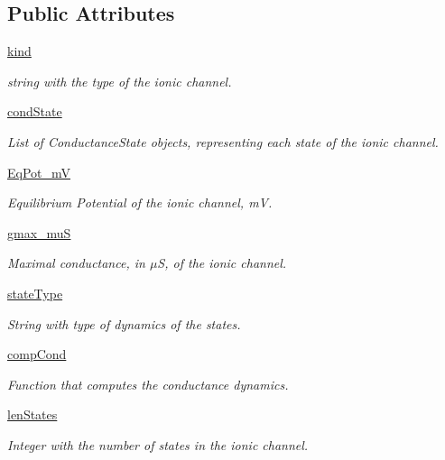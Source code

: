 \subsection*{Public Attributes}
\begin{DoxyCompactItemize}
\item 
\hyperlink{class_channel_conductance_1_1_channel_conductance_a7bf3e28aab2160014358cde589f2ec39}{kind}
\begin{DoxyCompactList}\small\item\em string with the type of the ionic channel. \end{DoxyCompactList}\item 
\hyperlink{class_channel_conductance_1_1_channel_conductance_a628553cbc1efd93b30b0a15afd4417d9}{cond\+State}
\begin{DoxyCompactList}\small\item\em List of Conductance\+State objects, representing each state of the ionic channel. \end{DoxyCompactList}\item 
\hyperlink{class_channel_conductance_1_1_channel_conductance_a654a73b6cd5853b509e7f7fba060572b}{Eq\+Pot\+\_\+mV}
\begin{DoxyCompactList}\small\item\em Equilibrium Potential of the ionic channel, mV. \end{DoxyCompactList}\item 
\hyperlink{class_channel_conductance_1_1_channel_conductance_a80a0238a90b30b411c9381f682d0aeec}{gmax\+\_\+muS}
\begin{DoxyCompactList}\small\item\em Maximal conductance, in $\mu$S, of the ionic channel. \end{DoxyCompactList}\item 
\hyperlink{class_channel_conductance_1_1_channel_conductance_aa3c889bb4528c3abe7b69862cf87119d}{state\+Type}
\begin{DoxyCompactList}\small\item\em String with type of dynamics of the states. \end{DoxyCompactList}\item 
\hyperlink{class_channel_conductance_1_1_channel_conductance_a0a91eec3fa2b1dfc66c6379943a5907f}{comp\+Cond}
\begin{DoxyCompactList}\small\item\em Function that computes the conductance dynamics. \end{DoxyCompactList}\item 
\hyperlink{class_channel_conductance_1_1_channel_conductance_ae217799d13e5d225af048b7ba503fde1}{len\+States}
\begin{DoxyCompactList}\small\item\em Integer with the number of states in the ionic channel. \end{DoxyCompactList}\end{DoxyCompactItemize}


